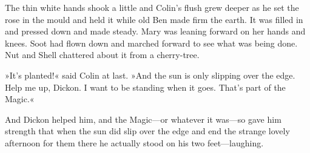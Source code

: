 The thin white hands shook a little and Colin's flush grew deeper as he set the rose in the mould and held it while old Ben made firm the earth. It was filled in and pressed down and made steady. Mary was leaning forward on her hands and knees. Soot had flown down and marched forward to see what was being done. Nut and Shell chattered about it from a cherry-tree.

»It's planted!« said Colin at last. »And the sun is only slipping over the edge. Help me up, Dickon. I want to be standing when it goes. That's part of the Magic.«

And Dickon helped him, and the Magic—or whatever it was—so gave him strength that when the sun did slip over the edge and end the strange lovely afternoon for them there he actually stood on his two feet—laughing.